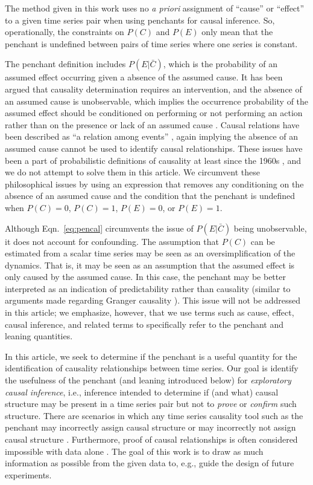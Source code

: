 \documentclass[twocolumn,aps,pre,groupedaddress]{revtex4-1}
\begin{document}
The method given in this work uses no {\em a priori} assignment of ``cause'' or ``effect'' to a given time series pair when using penchants for causal inference.  So, operationally, the constraints on $P(C)$ and $P(E)$ only mean that the penchant is undefined between pairs of time series where one series is constant. 

The penchant definition includes $P(E|\bar{C})$, which is the probability of an assumed effect occurring given a absence of the assumed cause.  It has been argued that causality determination requires an intervention, and the absence of an assumed cause is unobservable, which implies the occurrence probability of the assumed effect should be conditioned on performing or not performing an action rather than on the presence or lack of an assumed cause \cite{Pearl2000}.  Causal relations have been described as ``a relation among events'' \cite{Bunge1979}, again implying the absence of an assumed cause cannot be used to identify causal relationships.  These issues have been a part of probabilistic definitions of causality at least since the 1960s \cite{Suppes1970}, and we do not attempt to solve them in this article.  We circumvent these philosophical issues by using an expression that removes any conditioning on the absence of an assumed cause and the condition that the penchant is undefined when $P(C)=0$, $P(C)=1$, $P(E)=0$, or $P(E)=1$. 

Although Eqn.\ \ref{eq:pencal} circumvents the issue of $P(E|\bar{C})$ being unobservable, it does not account for confounding.  The assumption that $P(C)$ can be estimated from a scalar time series may be seen as an oversimplification of the dynamics.  That is, it may be seen as an assumption that the assumed effect is only caused by the assumed cause.  In this case, the penchant may be better interpreted as an indication of predictability rather than causality (similar to arguments made regarding Granger causality \cite{Sugihara2012}).  This issue will not be addressed in this article;  we emphasize, however, that we use terms such as cause, effect, causal inference, and related terms to specifically refer to the penchant and leaning quantities.  

In this article, we seek to determine if the penchant is a useful quantity for the identification of causality relationships between time series.  Our goal is identify the usefulness of the penchant (and leaning introduced below) for {\em exploratory causal inference}, i.e., inference intended to determine if (and what) causal structure may be present in a time series pair but not to {\em prove} or {\em confirm} such structure.  There are scenarios in which any time series causality tool such as the penchant may incorrectly assign causal structure or may incorrectly not assign causal structure \cite{Illari2014}.  Furthermore, proof of causal relationships is often considered impossible with data alone \cite{Pearl2000,Illari2014,Rubin2015}.  The goal of this work is to draw as much information as possible from the given data to, e.g., guide the design of future experiments.
\end{document}
